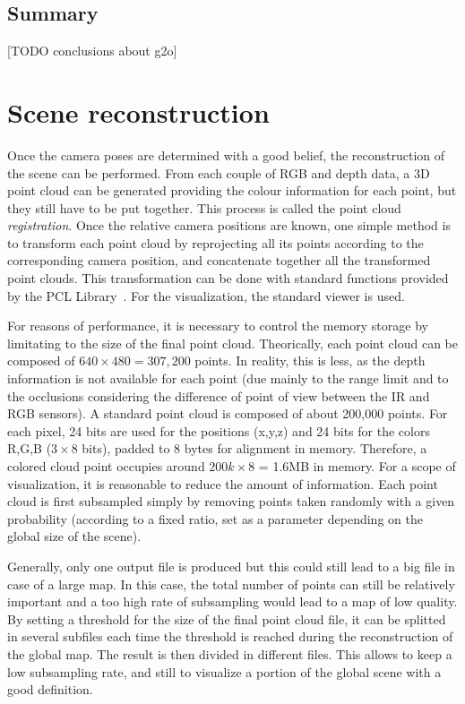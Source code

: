 \section{Summary}

[TODO conclusions about g2o]

\clearpage

\chapter{Scene reconstruction}
\label{chap:reconstruction}

Once the camera poses are determined with a good belief, the reconstruction of the scene can be performed. From each couple of RGB and depth data, a 3D point cloud can be generated providing the colour information for each point, but they still have to be put together. This process is called the point cloud \emph{registration}. Once the relative camera positions are known, one simple method is to transform each point cloud by reprojecting all its points according to the corresponding camera position, and concatenate together all the transformed point clouds. This transformation can be done with standard functions provided by the PCL Library~\cite{Rusu_ICRA2011_PCL}. For the visualization, the standard viewer is used.

For reasons of performance, it is necessary to control the memory storage by limitating to the size of the final point cloud. Theorically, each point cloud can be composed of $640\times480 = 307,200$ points. In reality, this is less, as the depth information is not available for each point (due mainly to the range limit and to the occlusions considering the difference of point of view between the IR and RGB sensors). A standard point cloud is composed of about 200,000 points. For each pixel, 24 bits are used for the positions (x,y,z) and 24 bits for the colors R,G,B ($3\times8$ bits), padded to 8 bytes for alignment in memory. Therefore, a colored cloud point occupies around $200k\times8$ = 1.6MB in memory. For a scope of visualization, it is reasonable to reduce the amount of information. Each point cloud is first subsampled simply by removing points taken randomly with a given probability (according to a fixed ratio, set as a parameter depending on the global size of the scene).

Generally, only one output file is produced but this could still lead to a big file in case of a large map. In this case, the total number of points can still be relatively important and a too high rate of subsampling would lead to a map of low quality. By setting a threshold for the size of the final point cloud file, it can be splitted in several subfiles each time the threshold is reached during the reconstruction of the global map. The result is then divided in different files. This allows to keep a low subsampling rate, and still to visualize a portion of the global scene with a good definition.


